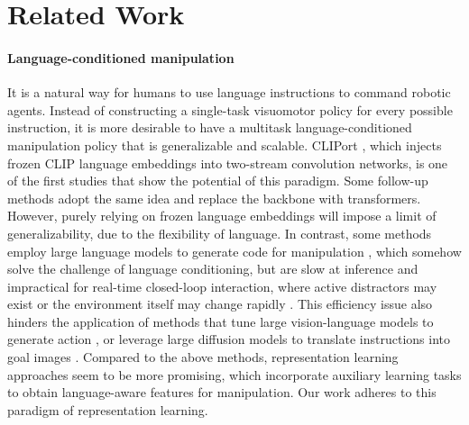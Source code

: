 \section{Related Work}
\label{sec:relat}

\paragraph{Language-conditioned manipulation}
It is a natural way for humans to use language instructions to command robotic agents. Instead of constructing a single-task visuomotor policy for every possible instruction, it is more desirable to have a multitask language-conditioned manipulation policy that is generalizable and scalable. CLIPort \cite{shridhar2022cliport}, which injects frozen CLIP \cite{radford2021learning} language embeddings into two-stream convolution networks, is one of the first studies that show the potential of this paradigm. Some follow-up methods \cite{bharadhwaj2024roboagent} adopt the same idea and replace the backbone with transformers. However, purely relying on frozen language embeddings will impose a limit of generalizability, due to the flexibility of language. In contrast, some methods employ large language models to generate code for manipulation \cite{10160591,huang2023instruct2act}, which somehow solve the challenge of language conditioning, but are slow at inference and impractical for real-time closed-loop interaction, where active distractors may exist \cite{yu2024hierarchical} or the environment itself may change rapidly \cite{zhang2024catch}. This efficiency issue also hinders the application of methods that tune large vision-language models to generate action \cite{brohan2023rt,kim2024openvla}, or leverage large diffusion models to translate instructions into goal images \cite{blackzero, shridhargenerative, li2024gr}. Compared to the above methods, representation learning approaches \cite{nair2023r3m, ma2023liv, karamcheti2023voltron, nguyen2024robotic, wuunleashing, zeng2024learning, yang2024spatiotemporal, bharadhwaj2024gen2act} seem to be more promising, which incorporate auxiliary learning tasks to obtain language-aware features for manipulation. Our work adheres to this paradigm of representation learning.

